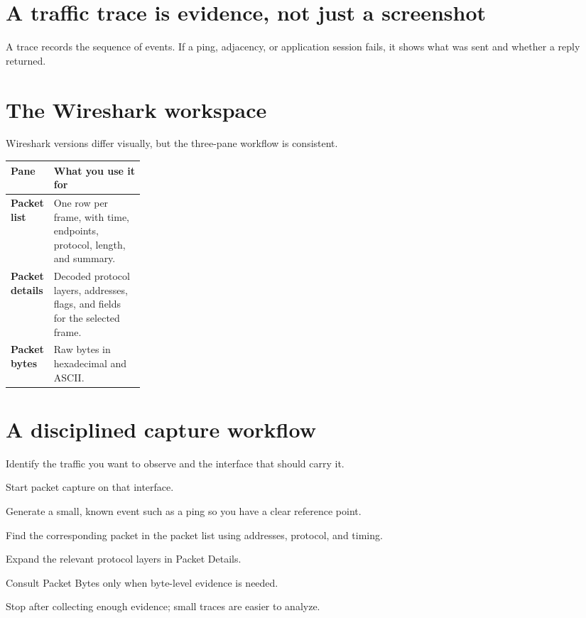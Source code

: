 \section{A traffic trace is evidence, not just a screenshot}
A trace records the sequence of events. If a ping, adjacency, or application session fails, it shows what was sent and whether a reply returned.


\section{The Wireshark workspace}
Wireshark versions differ visually, but the three-pane workflow is consistent.


\begin{tabularx}{\linewidth}{>{\bfseries}p{0.22\linewidth}X}
\toprule
Pane & What you use it for\\\midrule
Packet list & One row per frame, with time, endpoints, protocol, length, and summary.\\
Packet details & Decoded protocol layers, addresses, flags, and fields for the selected frame.\\
Packet bytes & Raw bytes in hexadecimal and ASCII.\\\bottomrule
\end{tabularx}

\section{A disciplined capture workflow}
\begin{netsteps}
\item Identify the traffic you want to observe and the interface that should carry it.
\item Start packet capture on that interface.
\item Generate a small, known event such as a ping so you have a clear reference point.
\item Find the corresponding packet in the packet list using addresses, protocol, and timing.
\item Expand the relevant protocol layers in Packet Details.
\item Consult Packet Bytes only when byte-level evidence is needed.
\item Stop after collecting enough evidence; small traces are easier to analyze.
\end{netsteps}

